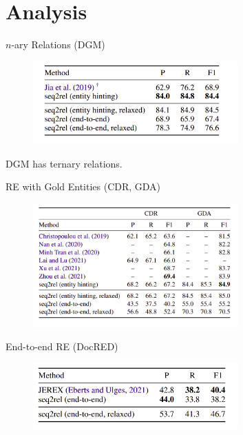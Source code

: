 \documentclass[usenames,dvipsnames,pdf]{beamer}
\begin{document}
        
        \section{Analysis}


        \begin{frame}{$n$-ary Relations (DGM)}
          \begin{figure}
            \includegraphics[width=0.7\textwidth,height=0.7\textheight,keepaspectratio]{DGM_n_ary_comparison} 
          \end{figure}
          DGM has ternary relations.
        \end{frame}

        \begin{frame}{RE with Gold Entities (CDR, GDA)}
          \begin{figure}
            \includegraphics[width=0.7\textwidth,height=0.7\textheight,keepaspectratio]{CDR_GDA_gold_entities} 
          \end{figure}
        \end{frame}

        \begin{frame}{End-to-end RE (DocRED)}
          \begin{figure}
            \includegraphics[width=0.7\textwidth,height=0.7\textheight,keepaspectratio]{DocRED_e2e_comparison} 
          \end{figure}
        \end{frame}
\end{document}
